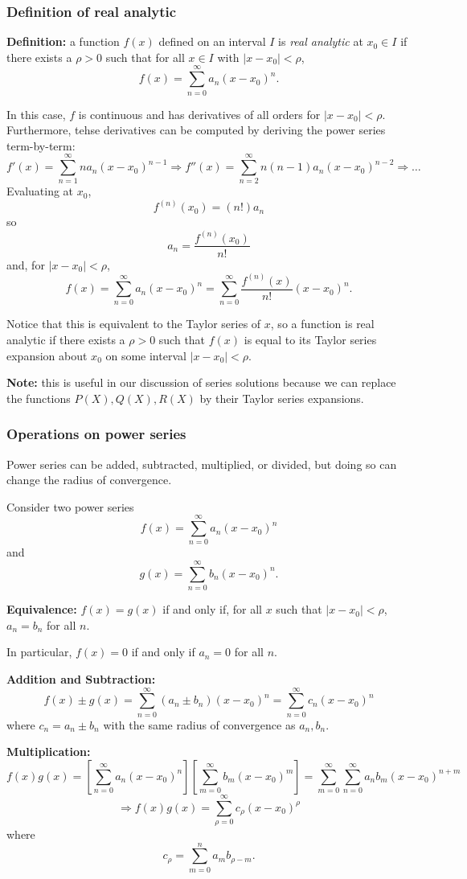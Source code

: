 \documentclass[11pt]{article}
\newcommand{\definition}{\textbf{Definition: }}
\newcommand{\sumseries}{\sum_{n=0}^{\infty}}
\newcommand{\sumseriesone}{\sum_{n=1}^{\infty}}
\newcommand{\sumseriestwo}{\sum_{n=2}^{\infty}}
\newcommand{\powerser}{(x - x_0)^n}
\begin{document}
\subsubsection{Definition of real analytic}
	\definition a function $f(x)$ defined on an interval $I$ is \emph{real analytic} at $x_0 \in I$ if there exists a $\rho > 0$ such that for all $x \in I$ with $|x-x_0| < \rho$,
		$$ f(x) = \sumseries a_n \powerser. $$

	In this case, $f$ is continuous and has derivatives of all orders for $|x-x_0| < \rho$. Furthermore, tehse derivatives can be computed by deriving the power series term-by-term:
		$$ f'(x) = \sumseriesone n a_n (x-x_0)^{n-1} \Rightarrow f''(x) = \sumseriestwo n(n-1) a_n (x-x_0)^{n-2} \Rightarrow \ldots $$
	Evaluating at $x_0$,
		$$ f^{(n)} (x_0) = (n!) a_n $$
	so
		$$ a_n = \frac{f^{(n)} (x_0)}{n!} $$
	and, for $|x - x_0| < \rho$,
		$$ f(x) = \sumseries a_n \powerser = \sumseries \frac{f^{(n)} (x)}{n!} \powerser.$$

	Notice that this is equivalent to the Taylor series of $x$, so a function is real analytic if there exists a $\rho > 0$ such that $f(x)$ is equal to its Taylor series expansion about $x_0$ on some interval $|x - x_0| < \rho$.

	\textbf{Note:} this is useful in our discussion of series solutions because we can replace the functions $P(X), Q(X), R(X)$ by their Taylor series expansions.

\subsubsection{Operations on power series}
	Power series can be added, subtracted, multiplied, or divided, but doing so can change the radius of convergence.

	Consider two power series
		$$ f(x) = \sumseries a_n \powerser $$
	and
		$$ g(x) = \sumseries b_n \powerser. $$

	\textbf{Equivalence:} $f(x) = g(x)$ if and only if, for all $x$ such that $|x - x_0| < \rho$, $a_n = b_n$ for all $n$.

	In particular, $f(x) = 0$ if and only if $a_n = 0$ for all $n$.

	\textbf{Addition and Subtraction:}
		$$ f(x) \pm g(x) = \sumseries (a_n \pm b_n) \powerser = \sumseries c_n \powerser $$
	where $c_n = a_n \pm b_n$ with the same radius of convergence as $a_n, b_n$.

	\textbf{Multiplication:}
		$$ f(x) g(x) = \left[ \sumseries a_n \powerser \right] \left[ \sum_{m=0}^{\infty} b_m (x-x_0)^m \right] = \sum_{m=0}^{\infty} \sumseries a_n b_m (x-x_0)^{n+m} $$
		$$ \Rightarrow f(x) g(x) = \sum_{\rho =0}^{\infty} c_{\rho} (x-x_0)^{\rho} $$
	where
		$$ c_{\rho} = \sum_{m=0}^n a_m b_{\rho - m}. $$
\end{document}
